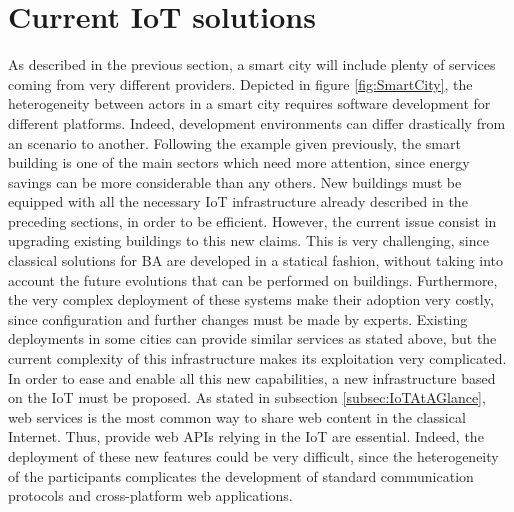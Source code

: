 \section{Current IoT solutions}
As described in the previous section, a smart city will include plenty of services coming from very different providers.
Depicted in figure \ref{fig:SmartCity}, the heterogeneity between actors in a smart city requires software development for different platforms.
Indeed, development environments can differ drastically from an scenario to another.
Following the example given previously, the smart building is one of the main sectors which need more attention, since energy savings can be more considerable than any others.
New buildings must be equipped with all the necessary IoT infrastructure already described in the preceding sections, in order to be efficient.
However, the current issue consist in upgrading existing buildings to this new claims.
This is very challenging, since classical solutions for BA are developed in a statical fashion, without taking into account the future evolutions that can be performed on buildings.
Furthermore, the very complex deployment of these systems make their adoption very costly, since configuration and further changes must be made by experts.
Existing deployments in some cities can provide similar services as stated above, but the current complexity of this infrastructure makes its exploitation very complicated.
In order to ease and enable all this new capabilities, a new infrastructure based on the IoT must be proposed.
As stated in subsection \ref{subsec:IoTAtAGlance}, web services is the most common way to share web content in the classical Internet.
Thus, provide web APIs relying in the IoT are essential.
Indeed, the deployment of these new features could be very difficult, since the heterogeneity of the participants complicates the development of standard communication protocols and cross-platform web applications.




